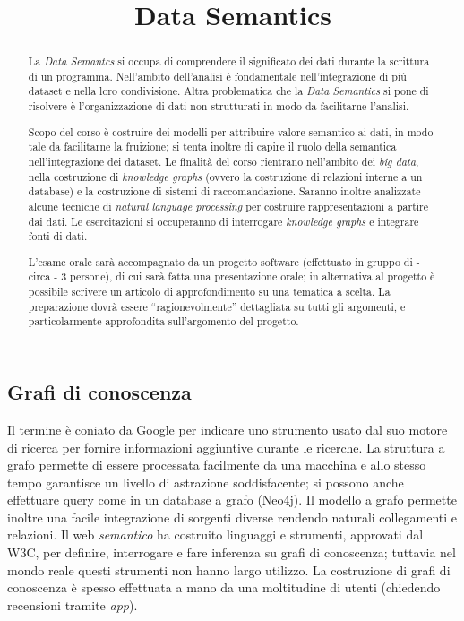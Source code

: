 \documentclass[11pt]{article}
\title{\textbf{Data Semantics}}
\author{}
\date{}
\begin{document}
\maketitle
\begin{multicols}{2}
\begin{abstract}
  La \textit{Data Semantcs} si occupa di comprendere il significato dei dati durante la scrittura di un programma.
  Nell'ambito dell'analisi è fondamentale nell'integrazione di più dataset e nella loro condivisione.
  Altra problematica che la \textit{Data Semantics} si pone di risolvere è l'organizzazione di dati non strutturati in modo da facilitarne l'analisi.
  
  Scopo del corso è costruire dei modelli per attribuire valore semantico ai dati, in modo tale da facilitarne la fruizione; si tenta inoltre di capire il ruolo della semantica nell'integrazione dei dataset.
  Le finalità del corso rientrano nell'ambito dei \textit{big data}, nella costruzione di \textit{knowledge graphs} (ovvero la costruzione di relazioni interne a un database) e la costruzione di sistemi di raccomandazione.
  Saranno inoltre analizzate alcune tecniche di \textit{natural language processing} per costruire rappresentazioni a partire dai dati. \newline
  Le esercitazioni si occuperanno di interrogare \textit{knowledge graphs} e integrare fonti di dati.

  L'esame orale sarà accompagnato da un progetto software (effettuato in gruppo di - circa - 3 persone), di cui sarà fatta una presentazione orale; in alternativa al progetto è possibile scrivere un articolo di approfondimento su una tematica a scelta.
  La preparazione dovrà essere ``ragionevolmente'' dettagliata su tutti gli argomenti, e particolarmente approfondita sull'argomento del progetto.
\end{abstract}
\vfill\null
\columnbreak
\tableofcontents
\vfill\null
\columnbreak

\newpage
\part{Grafi di conoscenza}
Il termine è coniato da Google per indicare uno strumento usato dal suo motore di ricerca per fornire informazioni aggiuntive durante le ricerche.
La struttura a grafo permette di essere processata facilmente da una macchina e allo stesso tempo garantisce un livello di astrazione soddisfacente; si possono anche effettuare query come in un database a grafo (Neo4j).
Il modello a grafo permette inoltre una facile integrazione di sorgenti diverse rendendo naturali collegamenti e relazioni.
Il web \textit{semantico} ha costruito linguaggi e strumenti, approvati dal W3C, per definire, interrogare e fare inferenza su grafi di conoscenza; tuttavia nel mondo reale questi strumenti non hanno largo utilizzo.
La costruzione di grafi di conoscenza è spesso effettuata a mano da una moltitudine di utenti (chiedendo recensioni tramite \textit{app}).


\end{multicols}
\end{document}

